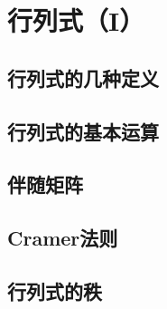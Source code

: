 \chapter{行列式（I）}

\section{行列式的几种定义}

\section{行列式的基本运算}

\section{伴随矩阵}

\section{Cramer法则}

\section{行列式的秩}